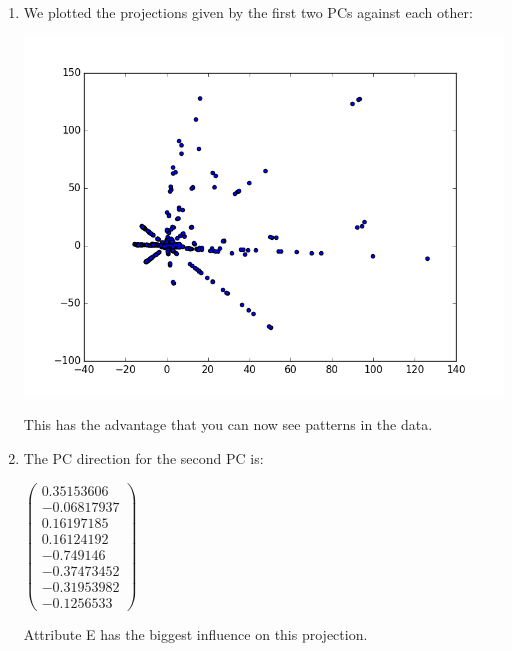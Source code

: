 \documentclass[12pt]{article}
\begin{document}
\begin{enumerate}[a]
	\item %
	We plotted the projections given by the first two PCs against each other:

	\includegraphics[width=\textwidth]{plot_1_2_2-d}

	This has the advantage that you can now see patterns in the data.

	\item %
	The PC direction for the second PC is:

	$\begin{pmatrix}
		0.35153606\\ -0.06817937\\ 0.16197185\\ 0.16124192\\ -0.749146\\ -0.37473452\\ -0.31953982\\ -0.1256533
	\end{pmatrix}$

	Attribute E has the biggest influence on this projection.
\end{enumerate}
\end{document}
